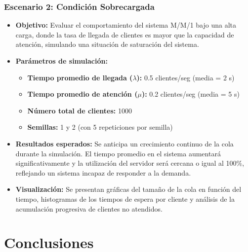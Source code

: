 \documentclass{article}
\begin{document}
\subsubsection{Escenario 2: Condición Sobrecargada}

\begin{itemize}
    \item \textbf{Objetivo:} Evaluar el comportamiento del sistema M/M/1 bajo una alta carga, donde la tasa de llegada de clientes es mayor que la capacidad de atención, simulando una situación de saturación del sistema.

    \item \textbf{Parámetros de simulación:}
    \begin{itemize}
        \item \textbf{Tiempo promedio de llegada ($\lambda$):} 0.5 clientes/seg (media = 2 s)
        \item \textbf{Tiempo promedio de atención ($\mu$):} 0.2 clientes/seg (media = 5 s)
        \item \textbf{Número total de clientes:} 1000
        \item \textbf{Semillas:} 1 y 2 (con 5 repeticiones por semilla)
    \end{itemize}

    \item \textbf{Resultados esperados:} 
    Se anticipa un crecimiento continuo de la cola durante la simulación. El tiempo promedio en el sistema aumentará significativamente y la utilización del servidor será cercana o igual al 100\%, reflejando un sistema incapaz de responder a la demanda.

    \item \textbf{Visualización:} 
    Se presentan gráficas del tamaño de la cola en función del tiempo, histogramas de los tiempos de espera por cliente y análisis de la acumulación progresiva de clientes no atendidos.

\end{itemize}





\section{Conclusiones}\label{sec:concl}
\end{document}
